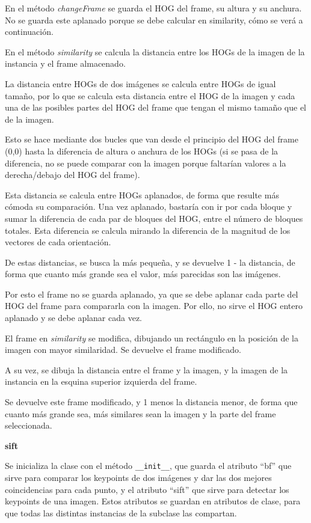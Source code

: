 \documentclass[12pt]{article}
\begin{document}
En el método \textit{changeFrame} se guarda el HOG del frame, su altura y su anchura. No se guarda este aplanado porque se debe calcular en similarity, cómo se verá a continuación.

En el método \textit{similarity} se calcula la distancia entre los HOGs de la imagen de la instancia y el frame almacenado.

La distancia entre HOGs de dos imágenes se calcula entre HOGs de igual tamaño, por lo que se calcula esta distancia entre el HOG de la imagen y cada una de las posibles partes del HOG del frame que tengan el mismo tamaño que el de la imagen. 

Esto se hace mediante dos bucles que van desde el principio del HOG del frame (0,0) hasta la diferencia de altura o anchura de los HOGs (si se pasa de la diferencia, no se puede comparar con la imagen porque faltarían valores a la derecha/debajo del HOG del frame).

Esta distancia se calcula entre HOGs aplanados, de forma que resulte más cómoda su comparación. Una vez aplanado, bastaría con ir por cada bloque y sumar la diferencia de cada par de bloques del HOG, entre el número de bloques totales. Esta diferencia se calcula mirando la diferencia de la magnitud de los vectores de cada orientación.

De estas distancias, se busca la más pequeña, y se devuelve 1 - la distancia, de forma que cuanto más grande sea el valor, más parecidas son las imágenes.

Por esto el frame no se guarda aplanado, ya que se debe aplanar cada parte del HOG del frame para compararla con la imagen. Por ello, no sirve el HOG entero aplanado y se debe aplanar cada vez.

El frame en \textit{similarity} se modifica, dibujando un rectángulo en la posición de la imagen con mayor similaridad. Se devuelve el frame modificado.

A su vez, se dibuja la distancia entre el frame y la imagen, y la imagen de la instancia en la esquina superior izquierda del frame.

Se devuelve este frame modificado, y 1 menos la distancia menor, de forma que cuanto más grande sea, más similares sean la imagen y la parte del frame seleccionada.

\textbf{sift}

Se inicializa la clase con el método \texttt{\_\_init\_\_}, que guarda el atributo ``bf'' que sirve para comparar los keypoints de dos imágenes y dar las dos mejores coincidencias para cada punto, y el atributo ``sift'' que sirve para detectar los keypoints de una imagen. Estos atributos se guardan en atributos de clase, para que todas las distintas instancias de la subclase las compartan.
\end{document}
